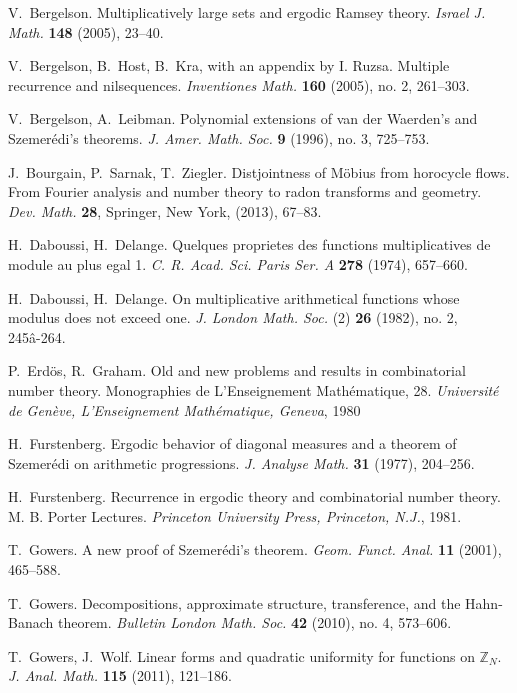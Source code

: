 \documentclass[11pt]{amsart}
\theoremstyle{definition}
\begin{document}
\begin{thebibliography}{9999}

 V.~Bergelson. Multiplicatively large sets and ergodic Ramsey theory.
{\em  Israel J.  Math.} {\bf 148} (2005), 23--40.

 V.~Bergelson, B.~Host, B.~Kra, with an appendix by I. Ruzsa.
Multiple recurrence and nilsequences. {\em Inventiones Math.} {\bf
160} (2005), no. 2, 261--303.

V.~Bergelson, A.~Leibman. Polynomial extensions of van der
Waerden's and Szemer\'edi's theorems.  {\em J. Amer. Math. Soc.}
{\bf 9} (1996), no. 3, 725--753.

 J.~Bourgain, P.~Sarnak, T.~Ziegler.
Distjointness of M\"obius from horocycle flows.
 From Fourier analysis and number theory to radon transforms and geometry. {\em Dev. Math.} {\bf 28}, Springer, New York,
 (2013),
 67--83.

 H.~Daboussi, H.~Delange. Quelques proprietes des functions multiplicatives de module au plus egal 1. {\em C. R. Acad. Sci. Paris Ser. A} {\bf 278} (1974),
657--660.

 H.~Daboussi, H.~Delange.
On multiplicative arithmetical functions whose modulus does not exceed one.
{\em J. London Math. Soc.} (2) {\bf 26} (1982), no. 2, 245â-264.

 P.~Erd\"{o}s, R.~Graham. Old and new problems and
results in combinatorial number theory. Monographies de
L'Enseignement Math\'ematique, 28. {\em Universit\'e de Gen\`eve,
L'Enseignement Math\'ematique, Geneva}, 1980

 H.~Furstenberg.
Ergodic behavior of diagonal measures and a theorem of Szemer\'edi
on arithmetic progressions. {\em J. Analyse Math.} {\bf 31} (1977),
204--256.

 H.~Furstenberg.
Recurrence in ergodic theory and combinatorial number theory. M. B. Porter Lectures. {\em Princeton University Press, Princeton, N.J.}, 1981.

 T.~Gowers. A new proof of Szemer\'edi's theorem. {\em Geom. Funct.
Anal.} {\bf 11} (2001), 465--588.

 T.~Gowers. Decompositions, approximate structure, transference, and the Hahn-Banach
theorem.  {\em Bulletin London Math. Soc.} {\bf 42} (2010),  no. 4, 573--606.

 T.~Gowers, J.~Wolf. Linear forms and quadratic uniformity for functions on $\mathbb{Z}_N$.
{\em J. Anal. Math.} {\bf 115} (2011), 121--186.


\end{thebibliography}
\end{document}
